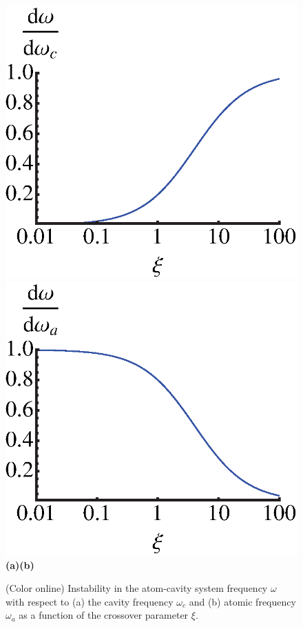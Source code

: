 \documentclass[aps,
twocolumn,
showpacs,
superscriptaddress,groupedaddress]{revtex4}
\begin{document}
\begin{figure}
\begin{center}
	\includegraphics[scale=0.42] {CavityInstability.eps} \hspace{2mm}
	\includegraphics[scale=0.42] {AtomInstability.eps}\\
\hspace{2mm} \textbf{(a)}\hspace{40mm}\textbf{(b)} \hspace{35mm}
\end{center}
\caption{(Color online) Instability in the atom-cavity system frequency
$\omega$ with respect to (a) the cavity frequency $\omega_c$ and (b)
atomic frequency $\omega_a$ as a function of the crossover parameter
$\xi$.}
\label{CavityInstability}
\end{figure}
\end{document}
